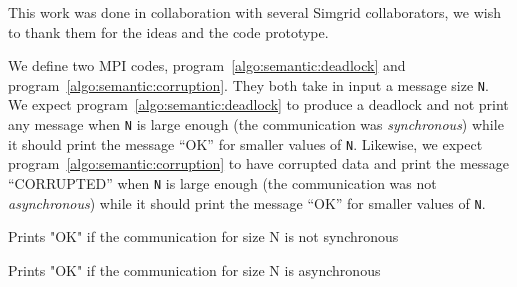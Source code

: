             This work was done in collaboration with several Simgrid collaborators, we wish to thank them for the ideas
            and the code prototype.

            We define two MPI codes, program~\ref{algo:semantic:deadlock} and program~\ref{algo:semantic:corruption}.
            They both take in input a message size \texttt{N}. We expect program~\ref{algo:semantic:deadlock} to produce
            a deadlock and not print any message when \texttt{N} is large enough (the communication was
            \emph{synchronous}) while it should print the message ``OK'' for smaller values of \texttt{N}. Likewise, we
            expect program~\ref{algo:semantic:corruption} to have corrupted data and print the message ``CORRUPTED''
            when \texttt{N} is large enough (the communication was not \emph{asynchronous}) while it should print the
            message ``OK'' for smaller values of \texttt{N}.
            \begin{algorithm}
                \DontPrintSemicolon
                \caption{Prints "OK" if the communication for size N is not synchronous}
                \label{algo:semantic:deadlock}
            \end{algorithm}

            \begin{algorithm}
                \DontPrintSemicolon
                \caption{Prints "OK" if the communication for size N is asynchronous}
                \label{algo:semantic:corruption}
            \end{algorithm}

